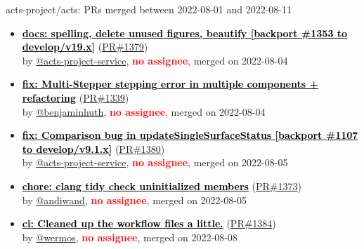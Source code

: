 \begin{frame}[allowframebreaks]{ acts-project/acts: PRs merged 
between 2022-08-01 and 2022-08-11
}
\begin{itemize}
    \item\prmerged
    \hspace*{0.1em}
    \textbf{\href{https://github.com/acts-project/acts/pull/1379}{\textcolor{black}{docs: spelling, delete unused figures, beautify [backport \#1353 to develop/v19.x]}}}
    (\href{https://github.com/acts-project/acts/pull/1379}{PR\#1379}) \\
    by \href{https://github.com/acts-project-service}{@acts-project-service}, {}\textbf{\textcolor{Red}{no assignee}}, merged on 2022-08-04

    \item\prmerged
    \hspace*{0.1em}
    \textbf{\href{https://github.com/acts-project/acts/pull/1339}{\textcolor{black}{fix: Multi-Stepper stepping error in multiple components + refactoring}}}
    (\href{https://github.com/acts-project/acts/pull/1339}{PR\#1339}) \\
    by \href{https://github.com/benjaminhuth}{@benjaminhuth}, {}\textbf{\textcolor{Red}{no assignee}}, merged on 2022-08-04

    \item\prmerged
    \hspace*{0.1em}
    \textbf{\href{https://github.com/acts-project/acts/pull/1380}{\textcolor{black}{fix: Comparison bug in updateSingleSurfaceStatus [backport \#1107 to develop/v9.1.x]}}}
    (\href{https://github.com/acts-project/acts/pull/1380}{PR\#1380}) \\
    by \href{https://github.com/acts-project-service}{@acts-project-service}, {}\textbf{\textcolor{Red}{no assignee}}, merged on 2022-08-05

    \item\prmerged
    \hspace*{0.1em}
    \textbf{\href{https://github.com/acts-project/acts/pull/1373}{\textcolor{black}{chore: clang tidy check uninitialized members}}}
    (\href{https://github.com/acts-project/acts/pull/1373}{PR\#1373}) \\
    by \href{https://github.com/andiwand}{@andiwand}, {}\textbf{\textcolor{Red}{no assignee}}, merged on 2022-08-05

    \item\prmerged
    \hspace*{0.1em}
    \textbf{\href{https://github.com/acts-project/acts/pull/1384}{\textcolor{black}{ci: Cleaned up the workflow files a little.}}}
    (\href{https://github.com/acts-project/acts/pull/1384}{PR\#1384}) \\
    by \href{https://github.com/wermos}{@wermos}, {}\textbf{\textcolor{Red}{no assignee}}, merged on 2022-08-08


\end{itemize}
\end{frame}
